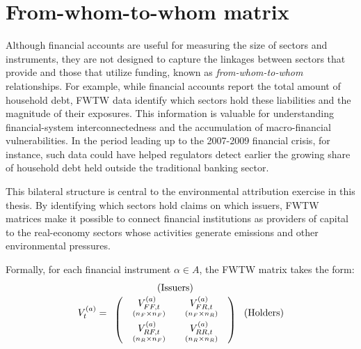 \section{From-whom-to-whom matrix}
\label{sec:FWTW_introduction}
Although financial accounts are useful for measuring the size of sectors and instruments, they are not designed to capture the linkages between sectors that provide and those that utilize funding, known as \textit{from-whom-to-whom} relationships. For example, while financial accounts report the total amount of household debt, FWTW data identify which sectors hold these liabilities and the magnitude of their exposures. This information is valuable for understanding financial-system interconnectedness and the accumulation of macro-financial vulnerabilities. In the period leading up to the 2007-2009 financial crisis, for instance, such data could have helped regulators detect earlier the growing share of household debt held outside the traditional banking sector.

This bilateral structure is central to the environmental attribution exercise in this thesis. By identifying which sectors hold claims on which issuers, FWTW matrices make it possible to connect financial institutions as providers of capital to the real-economy sectors whose activities generate emissions and other environmental pressures.



Formally, for each financial instrument $\alpha \in A$, the FWTW matrix takes the form: 
\[
V_t^{(a)}
=
\begin{array}{c}
\text{(Issuers)} \\[2pt]
\left(
\begin{array}{cc}
\begin{array}{c}
V_{FF,t}^{(a)}\\[-3pt]
{\scriptstyle (n_F \times n_F)}
\end{array}
&
\begin{array}{c}
V_{FR,t}^{(a)}\\[-3pt]
{\scriptstyle (n_F \times n_R)}
\end{array}
\\[8pt]
\begin{array}{c}
V_{RF,t}^{(a)}\\[-3pt]
{\scriptstyle (n_R \times n_F)}
\end{array}
&
\begin{array}{c}
V_{RR,t}^{(a)}\\[-3pt]
{\scriptstyle (n_R \times n_R)}
\end{array}
\end{array}
\right)
\end{array}
\hspace{0.3em}
\text{(Holders)}
\]

